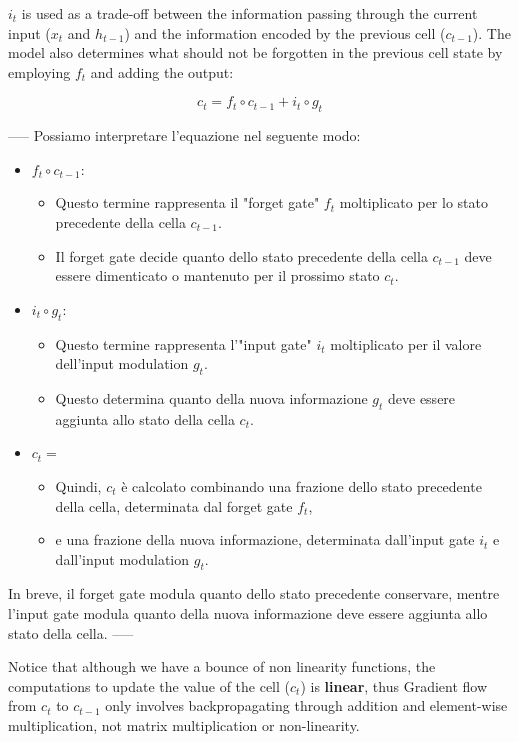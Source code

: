 $i_t$ is used as a trade-off between the information passing through the current input ($x_t$ and $h_{t-1}$) and the information encoded by the previous cell ($c_{t-1}$). The model also determines what should not be forgotten in the previous cell state by employing $f_t$ and adding the output:

$$c_t = f_t \circ c_{t-1} + i_t \circ g_t $$


-----
Possiamo interpretare l'equazione nel seguente modo:
\begin{itemize}
    \item \( f_t \circ c_{t-1}: \) 
    \begin{itemize}
        \item Questo termine rappresenta il "forget gate" \( f_t \) moltiplicato per lo stato precedente della cella \( c_{t-1} \).
        \item Il forget gate decide quanto dello stato precedente della cella \( c_{t-1} \) deve essere dimenticato o mantenuto per il prossimo stato \( c_t \).
    \end{itemize}
    \item \( i_t \circ g_t: \)
    \begin{itemize}
        \item Questo termine rappresenta l'"input gate" \( i_t \) moltiplicato per il valore dell'input modulation \( g_t \).
        \item Questo determina quanto della nuova informazione \( g_t \) deve essere aggiunta allo stato della cella \( c_t \).
    \end{itemize}
    \item \( c_t = \)
    \begin{itemize}
        \item Quindi, \( c_t \) è calcolato combinando una frazione dello stato precedente della cella, determinata dal forget gate \( f_t \),
        \item e una frazione della nuova informazione, determinata dall'input gate \( i_t \) e dall'input modulation \( g_t \).
    \end{itemize}
\end{itemize}

In breve, il forget gate modula quanto dello stato precedente conservare, mentre l'input gate modula quanto della nuova informazione deve essere aggiunta allo stato della cella.
-----

Notice that although we have a bounce of non linearity functions, the computations to update the value of the cell ($c_t$) is \textbf{linear}, thus Gradient flow from $c_t$ to $c_{t-1}$ only involves backpropagating through addition and element-wise multiplication, not matrix multiplication or non-linearity.


